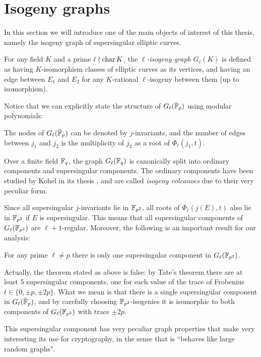 \section{Isogeny graphs}
In this section we will introduce one of the main objects of interest of this thesis, namely the isogeny graph of supersingular elliptic curves.

\begin{definition}
    For any field $K$ and a prime $\ell\nmid\operatorname{char} K$, the \emph{$\ell$-isogeny graph} $G_\ell(K)$ is defined as having $K$-isomorphism classes of elliptic curves as its vertices, and having an edge between $E_1$ and $E_2$ for any $K$-rational $\ell$-isogeny between them (up to isomorphism).
\end{definition}

Notice that we can explicitly state the structure of $G_\ell(\bar{\mathbb{F}}_p)$ using modular polynomials:
\begin{proposition}
    The nodes of $G_\ell(\bar {\mathbb{F}}_p)$ can be denoted by $j$-invariants, and the number of edges between $j_1$ and $j_2$ is the multiplicity of $j_2$ as a root of $\Phi_\ell(j_1,t)$.
\end{proposition}

Over a finite field $\mathbb{F}_q$, the graph $G_\ell(\mathbb{F}_q)$ is canonically split into ordinary components and supersingular components. The ordinary components have been studied by Kohel in its thesis \cite{Kohel_thesis}, and are called \emph{isogeny volcanoes} due to their very peculiar form.

Since all supersingular $j$-invariants lie in $\mathbb{F}_{p^2}$, all roots of $\Phi_\ell(j(E),t)$ also lie in $\mathbb{F}_{p^2}$ if $E$ is supersingular. This means that all supersingular components of $G_\ell(\mathbb{F}_{p^2})$ are $\ell+1$-regular. Moreover, the following is an important result for our analysis:
\begin{theorem}
    For any prime $\ell\neq p$ there is only one supersingular component in $G_\ell(\mathbb{F}_{p^2})$.
\end{theorem}
Actually, the theorem stated as above is false: by Tate's theorem there are at least $5$ supersingular components, one for each value of the trace of Frobenius $t\in\{0,\pm p,\pm 2p\}$. What we mean is that there is a single supersingular component in $G_\ell(\bar{\mathbb{F}}_p)$, and by carefully choosing $\mathbb{F}_{p^2}$-isogenies it is isomorphic to both components of $G_\ell(\mathbb{F}_{p^2})$ with trace $\pm 2p$.

This supersingular component has very peculiar graph properties that make very interesting its use for cryptography, in the sense that is ``behaves like large random graphs".

